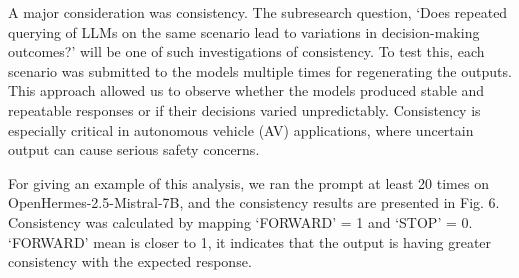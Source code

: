 \documentclass[conference]{IEEEtran}
\begin{document}
A major consideration was consistency. The subresearch question, `Does repeated querying of LLMs on the same scenario lead to variations in decision-making outcomes?'  will be one of such investigations of consistency.  To test this, each scenario was submitted to the models multiple times for regenerating the outputs. This approach allowed us to observe whether the models produced stable and repeatable responses or if their decisions varied unpredictably. Consistency is especially critical in autonomous vehicle (AV) applications, where uncertain output can cause serious safety concerns. 

For giving an example of this analysis, we ran the prompt at least 20 times on OpenHermes-2.5-Mistral-7B, and the consistency results are presented in Fig. 6. Consistency was calculated by mapping `FORWARD' = 1 and `STOP' = 0. `FORWARD' mean is closer to 1, it indicates that the output is having greater consistency with the expected response.
\end{document}
